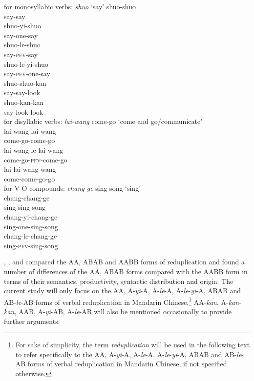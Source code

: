 \documentclass[11pt,a4paper,fleqn,draft]{article}
\begin{document}
\ea\label{ex:redup-forms}
	\ea for monosyllabic verbs: \emph{shuo} `say'
		\ea \gll shuo-shuo\\
		say-say\\
		\ex \gll shuo-yi-shuo\\
		say-one-say\\
		\ex \gll shuo-le-shuo\\
		say-\textsc{pfv}-say\\
		\ex \gll shuo-le-yi-shuo\\
		say-\textsc{pfv}-one-say\\
		\ex \gll shuo-shuo-kan\\
		say-say-look\\
		\ex \gll shuo-kan-kan\\
		 say-look-look\\
		\z
	\ex for disyllabic verbs: \emph{lai-wang} come-go `come and go/communicate'\\
		\ea \gll lai-wang-lai-wang\\
		come-go-come-go\\ 
		\ex \gll lai-wang-le-lai-wang\\
		come-go-\textsc{pfv}-come-go\\ 
		\ex \gll lai-lai-wang-wang\\
		come-come-go-go\\ 
		\z
	\ex\label{ex:forms-VO} for V-O compounds: \emph{chang-ge} sing-song `sing'\\
		\ea \gll chang-chang-ge\\
		sing-sing-song\\ 
		\ex \gll chang-yi-chang-ge\\
		sing-one-sing-song\\ 
		\ex \gll chang-le-chang-ge\\
		sing-\textsc{pfv}-sing-song\\ 
		\z
	\z
\z



\citet{Arcodiaetal2014}, \citet{Fan1964}, \citet{MelloniBasciano2018} and \citet{Xie2020} compared the AA, ABAB and AABB forms of reduplication 
and found a number of differences of the AA, ABAB forms compared with the AABB form in terms of their semantics, productivity, syntactic distribution and origin. 
The current study will only focus on the AA, A-\emph{yi}-A, A-\emph{le}-A, A-\emph{le}-\emph{yi}-A, ABAB and AB-\emph{le}-AB forms of verbal reduplication in Mandarin Chinese.\footnote{For sake of simplicity, 
the term \emph{reduplication} will be used in the following text to refer specifically to the AA, A-\emph{yi}-A, A-\emph{le}-A, A-\emph{le}-\emph{yi}-A, ABAB and AB-\emph{le}-AB forms of verbal reduplication in Mandarin Chinese, if not specified otherwise.}
AA-\emph{kan}, A-\emph{kan}-\emph{kan}, AAB, A-\emph{yi}-AB, A-\emph{le}-AB will also be mentioned occasionally to provide further arguments.
\end{document}
